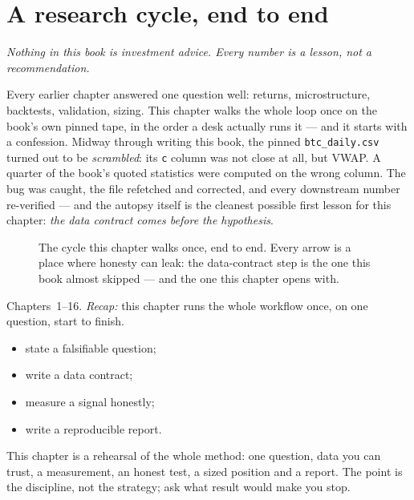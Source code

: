 \chapter{A research cycle, end to end}\label{ch:cycle}

\noindent\emph{Nothing in this book is investment advice. Every
number is a lesson, not a recommendation.}

\medskip
\noindent Every earlier chapter answered one question well:
returns, microstructure, backtests, validation, sizing. This
chapter walks the whole loop once on the book's own pinned tape,
in the order a desk actually runs it --- and it starts with a
confession. Midway through writing this book, the pinned
\texttt{btc\_daily.csv} turned out to be \emph{scrambled}: its
\texttt{c} column was not close at all, but VWAP. A quarter of
the book's quoted statistics were computed on the wrong column.
The bug was caught, the file refetched and corrected, and every
downstream number re-verified --- and the autopsy itself is the
cleanest possible first lesson for this chapter: \emph{the data
contract comes before the hypothesis}.

\begin{figure}[htbp]\centering

\caption{The cycle this chapter walks once, end to end. Every
arrow is a place where honesty can leak: the data-contract step
is the one this book almost skipped --- and the one this chapter
opens with.}
\label{fig:cycle}
\end{figure}

\begin{rulebox}
Chapters~1--16. \emph{Recap:} this chapter runs the whole workflow once, on one question, start to finish.
\end{rulebox}
\begin{wins}
\begin{itemize}
\item state a falsifiable question;
\item write a data contract;
\item measure a signal honestly;
\item write a reproducible report.
\end{itemize}
\end{wins}
\begin{principle}
This chapter is a rehearsal of the whole method: one question, data you can trust, a measurement, an honest test, a sized position and a report. The point is the discipline, not the strategy; ask what result would make you stop.
\end{principle}

